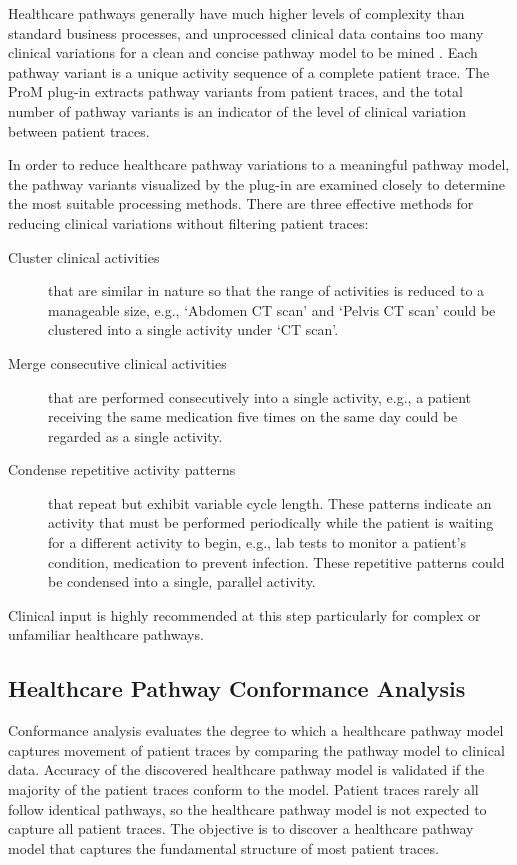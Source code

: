 Healthcare pathways generally have much higher levels of complexity than standard business processes, and unprocessed clinical data contains too many clinical variations for a clean and concise pathway model to be mined \cite{Huang2013, Veiga2010}. Each pathway variant is a unique activity sequence of a complete patient trace. The ProM plug-in  extracts pathway variants from patient traces, and the total number of pathway variants is an indicator of the level of clinical variation between patient traces.

In order to reduce healthcare pathway variations to a meaningful pathway model, the pathway variants visualized by the plug-in  are examined closely to determine the most suitable processing methods. 
There are three effective methods for reducing clinical variations without filtering patient traces:

\begin{description}
    \item[Cluster clinical activities] that are similar in nature so that the range of activities is reduced to a manageable size, e.g., `Abdomen CT scan' and `Pelvis CT scan' could be clustered into a single activity under `CT scan'.
    \item[Merge consecutive clinical activities] that are performed consecutively into a single activity, e.g., a patient receiving the same medication five times on the same day could be regarded as a single activity.
    \item[Condense repetitive activity patterns] 
         that repeat but exhibit variable cycle length. These patterns indicate an activity that must be performed periodically while the patient is waiting for a different activity to begin, e.g., lab tests to monitor a patient’s condition, medication to prevent infection. These repetitive patterns could be condensed into a single, parallel activity.
\end{description}
Clinical input is highly recommended at this step particularly for complex or unfamiliar healthcare pathways. 


\subsection{Healthcare Pathway Conformance Analysis}
Conformance analysis evaluates the degree to which a healthcare pathway model captures movement of patient traces by comparing the pathway model to clinical data. 
Accuracy of the discovered healthcare pathway model is validated if the majority of the patient traces conform to the model. Patient traces rarely all follow identical pathways, so the healthcare pathway model is not expected to capture all patient traces. The objective is to discover a healthcare pathway model that captures the fundamental structure of most patient traces. 


